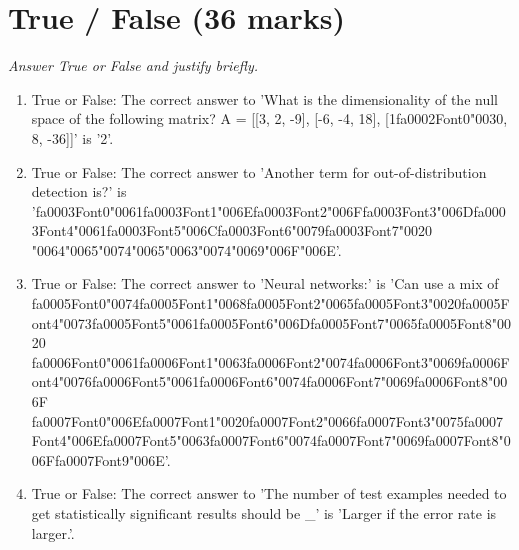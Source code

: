\documentclass[12pt]{article}
\begin{document}
\section*{True / False (36 marks)}
\textit{Answer True or False and justify briefly.}
\begin{enumerate}[label=\arabic*.]
\item True or False: The correct answer to 'What is the dimensionality of the null space of the following matrix? A = [[3, 2, -9], [-6, -4, 18], [1{\csname fa0002Font0\endcsname\char"0030}, 8, -36]]' is '2'.
\item True or False: The correct answer to 'Another term for out-of-distribution detection is?' is '{\csname fa0003Font0\endcsname\char"0061}{\csname fa0003Font1\endcsname\char"006E}{\csname fa0003Font2\endcsname\char"006F}{\csname fa0003Font3\endcsname\char"006D}{\csname fa0003Font4\endcsname\char"0061}{\csname fa0003Font5\endcsname\char"006C}{\csname fa0003Font6\endcsname\char"0079}{\csname fa0003Font7\endcsname\char"0020} {\char"0064}{\char"0065}{\char"0074}{\char"0065}{\char"0063}{\char"0074}{\char"0069}{\char"006F}{\char"006E}'.
\item True or False: The correct answer to 'Neural networks:' is 'Can use a mix of {\csname fa0005Font0\endcsname\char"0074}{\csname fa0005Font1\endcsname\char"0068}{\csname fa0005Font2\endcsname\char"0065}{\csname fa0005Font3\endcsname\char"0020}{\csname fa0005Font4\endcsname\char"0073}{\csname fa0005Font5\endcsname\char"0061}{\csname fa0005Font6\endcsname\char"006D}{\csname fa0005Font7\endcsname\char"0065}{\csname fa0005Font8\endcsname\char"0020} {\csname fa0006Font0\endcsname\char"0061}{\csname fa0006Font1\endcsname\char"0063}{\csname fa0006Font2\endcsname\char"0074}{\csname fa0006Font3\endcsname\char"0069}{\csname fa0006Font4\endcsname\char"0076}{\csname fa0006Font5\endcsname\char"0061}{\csname fa0006Font6\endcsname\char"0074}{\csname fa0006Font7\endcsname\char"0069}{\csname fa0006Font8\endcsname\char"006F} {\csname fa0007Font0\endcsname\char"006E}{\csname fa0007Font1\endcsname\char"0020}{\csname fa0007Font2\endcsname\char"0066}{\csname fa0007Font3\endcsname\char"0075}{\csname fa0007Font4\endcsname\char"006E}{\csname fa0007Font5\endcsname\char"0063}{\csname fa0007Font6\endcsname\char"0074}{\csname fa0007Font7\endcsname\char"0069}{\csname fa0007Font8\endcsname\char"006F}{\csname fa0007Font9\endcsname\char"006E}'.
\item True or False: The correct answer to 'The number of test examples needed to get statistically significant results should be \_' is 'Larger if the error rate is larger.'.

\end{enumerate}
\end{document}
